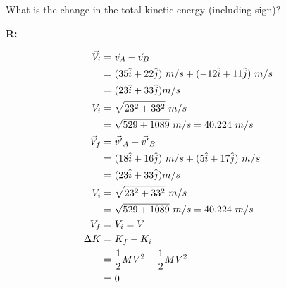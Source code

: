 		What is the change in the total kinetic energy (including sign)?

		\textbf{R:}

		\begin{align}
			\vec{V}_{i} = \ &\vec{v}_{A} + \vec{v}_{B}& \notag \\
			= \ &(35 \hat{i} + 22 \hat{j}) \ m/s + (-12 \hat{i} + 11 \hat{j}) \ m/s& \notag \\
			= \ &(23 \hat{i} + 33 \hat{j}) m/s& \notag \\
			V_{i} = \ &\sqrt{23^{2} + 33^{2}} \ m/s& \notag \\
			= \ &\sqrt{529 + 1089} \ m/s = 40.224 \ m/s& \notag \\
			\vec{V}_{f} = \ &\vec{v'}_{A} + \vec{v'}_{B}& \notag \\
			= \ &(18 \hat{i} + 16 \hat{j}) \ m/s + (5 \hat{i} + 17 \hat{j}) \ m/s& \notag \\
			= \ &(23 \hat{i} + 33 \hat{j}) m/s& \notag \\
			V_{i} = \ &\sqrt{23^{2} + 33^{2}} \ m/s& \notag \\
			= \ &\sqrt{529 + 1089} \ m/s = 40.224 \ m/s& \notag \\
			V_{f} = \ &V_{i} = V& \notag \\
			\Delta K = \ &K_{f} - K_{i}& \notag \\
			= \ &\frac{1}{2}MV^{2} - \frac{1}{2}MV^{2}& \notag \\
			= \ &0&
		\end{align}
